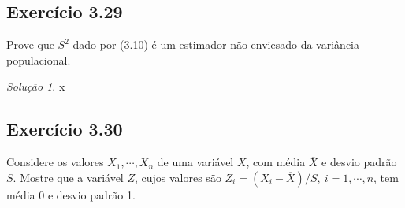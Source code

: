 \documentclass[
]{latex/krantz}
\theoremstyle{definition}
\theoremstyle{definition}
\theoremstyle{definition}
\theoremstyle{definition}
\theoremstyle{remark}
\newtheorem*{solution}{Solução}
\begin{document}
\hypertarget{exr3-29}{%
\subsection*{Exercício 3.29}\label{exr3-29}}

Prove que \(S^{2}\) dado por (3.10) é um estimador não enviesado da variância populacional.

\begin{solution}
x
\end{solution}

\hypertarget{exr3-30}{%
\subsection*{Exercício 3.30}\label{exr3-30}}

Considere os valores \(X_{1}, \cdots , X_{n}\) de uma variável \(X\), com média \(\overline{X}\) e desvio padrão \(S\). Mostre que a variável \(Z\), cujos valores são \(Z_{i} = (X_{i} - \overline{X}) / S, \ i = 1, \cdots , n\), tem média 0 e desvio padrão 1.
\end{document}
